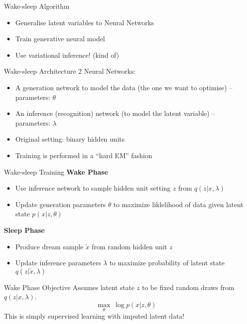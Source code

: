 \documentclass[14pt]{beamer}
\begin{document}
\begin{frame}{Wake-sleep Algorithm}
\begin{itemize}
\item Generalise latent variables to Neural Networks
\item Train generative neural model
\item Use variational inference! (kind of)
\end{itemize}
\end{frame}

\begin{frame}{Wake-sleep Architecture}
2 Neural Networks:
\begin{itemize}
\pause
\item A generation network to model the data (the one we want to optimise) -- parameters: $ \theta $
\pause
\item An inference (recognition) network (to model the latent variable) -- parameters: $ \lambda $
\pause
\item Original setting: binary hidden units
\pause
\item Training is performed in a ``hard EM'' fashion
\end{itemize}
\end{frame}

\begin{frame}{Wake-sleep Training}
\textbf{Wake Phase} \\
\begin{itemize}
\item Use inference network to sample hidden unit setting $ z $ from $ q(z|x,\lambda) $
\item Update generation parameters $ \theta $ to maximize liklelihood of data given latent state $ p(x|z,\theta) $
\end{itemize}
\pause
\textbf{Sleep Phase}
\begin{itemize}
\item Produce dream sample $ \tilde{x} $ from random hidden unit $ z $
\item Update inference parameters $ \lambda $ to maximize probability of latent state $ q(z|\tilde{x},\lambda) $
\end{itemize}
\end{frame}

\begin{frame}{Wake Phase Objective}
Assumes latent state $ z $ to be fixed random draws from $ q(z|x,\lambda) $.
\begin{equation*}
\max_{\theta}~ \log p(x|z,\theta) 
\end{equation*}
This is simply supervised learning with imputed latent data!
\end{frame}
\end{document}
